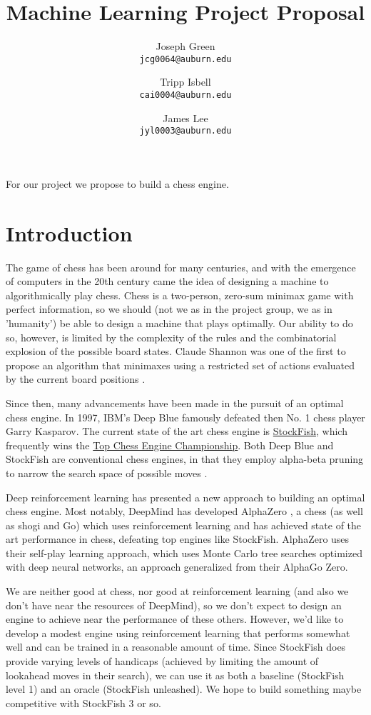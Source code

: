 \documentclass[notitlepage, 12pt]{article}
\title{Machine Learning Project Proposal}
\author{
  Joseph Green\\
  \texttt{jcg0064@auburn.edu}
  \and
  Tripp Isbell\\
  \texttt{cai0004@auburn.edu}
  \and
  James Lee\\
  \texttt{jyl0003@auburn.edu}
}
\date{}
\begin{document}
\maketitle
For our project we propose to build a chess engine.
\section*{Introduction}
The game of chess has been around for many centuries, and with the emergence of computers in the 20th century came the idea of designing a machine to algorithmically play chess. Chess is a two-person, zero-sum minimax game \cite{vonneumann} with perfect information, so we should (not we as in the project group, we as in 'humanity') be able to design a machine that plays optimally. Our ability to do so, however, is limited by the complexity of the rules and the combinatorial explosion of the possible board states. Claude Shannon was one of the first to propose an algorithm that minimaxes using a restricted set of actions evaluated by the current board positions \cite{shannon}. 

Since then, many advancements have been made in the pursuit of an optimal chess engine. In 1997, IBM's Deep Blue famously defeated then No. 1 chess player Garry Kasparov. The current state of the art chess engine is \href{https://stockfishchess.org/}{StockFish}, which frequently wins the \href{https://en.wikipedia.org/wiki/Top_Chess_Engine_Championship}{Top Chess Engine Championship}. Both Deep Blue and StockFish are conventional chess engines, in that they employ alpha-beta pruning to narrow the search space of possible moves \cite{alphabeta}. 

Deep reinforcement learning has presented a new approach to building an optimal chess engine. Most notably, DeepMind has developed AlphaZero \cite{alphazero}, a chess (as well as shogi and Go) which uses reinforcement learning and has achieved state of the art performance in chess, defeating top engines like StockFish. AlphaZero uses their self-play learning approach, which uses Monte Carlo tree searches optimized with deep neural networks, an approach generalized from their AlphaGo Zero\cite{alphagozero}.

We are neither good at chess, nor good at reinforcement learning (and also we don't have near the resources of DeepMind), so we don't expect to design an engine to achieve near the performance of these others. However, we'd like to develop a modest engine using reinforcement learning that performs somewhat well and can be trained in a reasonable amount of time. Since StockFish does provide varying levels of handicaps (achieved by limiting the amount of lookahead moves in their search), we can use it as both a baseline (StockFish level 1) and an oracle (StockFish unleashed). We hope to build something maybe competitive with StockFish 3 or so.
\end{document}
